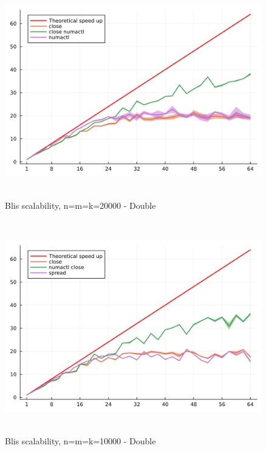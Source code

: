 \documentclass[
  letterpaper,
  DIV=11,
  numbers=noendperiod]{scrartcl}
\begin{document}
\begin{figure}

{\centering \includegraphics[width=\textwidth,height=3.64583in]{img/blis_scalability_double_20000.png}

}

\caption{Blis scalability, n=m=k=20000 - Double}

\end{figure}

\begin{figure}

{\centering \includegraphics[width=\textwidth,height=3.64583in]{img/blis_scalability_double_10000.png}

}

\caption{Blis scalability, n=m=k=10000 - Double}

\end{figure}
\end{document}
